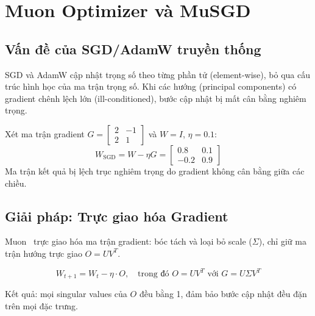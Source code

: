 \chapter{Muon Optimizer và MuSGD}
\label{ch:muon}

\section{Vấn đề của SGD/AdamW truyền thống}

SGD và AdamW cập nhật trọng số theo từng phần tử (element-wise), bỏ qua cấu trúc hình học của ma trận trọng số. Khi các hướng (principal components) có gradient chênh lệch lớn (ill-conditioned), bước cập nhật bị mất cân bằng nghiêm trọng.

\begin{conceptbox}
Xét ma trận gradient $G = \begin{bmatrix} 2 & -1 \\ 2 & 1 \end{bmatrix}$ và $W = I$, $\eta = 0.1$:
\begin{equation}
    W_{\text{SGD}} = W - \eta G = \begin{bmatrix} 0.8 & 0.1 \\ -0.2 & 0.9 \end{bmatrix}
\end{equation}
Ma trận kết quả bị lệch trục nghiêm trọng do gradient không cân bằng giữa các chiều.
\end{conceptbox}

\section{Giải pháp: Trực giao hóa Gradient}

Muon~\cite{muon} trực giao hóa ma trận gradient: bóc tách và loại bỏ scale ($\Sigma$), chỉ giữ ma trận hướng trực giao $O = UV^T$.

\begin{equation}
    W_{t+1} = W_t - \eta \cdot O, \quad \text{trong đó } O = UV^T \text{ với } G = U\Sigma V^T
\end{equation}

Kết quả: mọi singular values của $O$ đều bằng 1, đảm bảo bước cập nhật đều đặn trên mọi đặc trưng.

